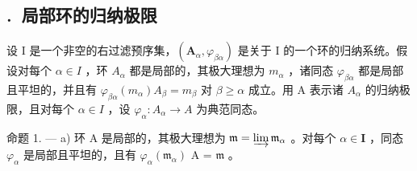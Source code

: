 \subsection*{\theappendixitem.\ 局部环的归纳极限}
{}

设 I 是一个非空的右过滤预序集，\((\mathbf{A}_{\alpha}, \varphi_{\beta\alpha})\) 是关于 I 的一个环的归纳系统。假设对每个 \(\alpha \in I\) ，环 \(A_{\alpha}\) 都是局部的，其极大理想为 \(m_{\alpha}\) ，诸同态 \(\varphi_{\beta\alpha}\) 都是局部且平坦的，并且有 \(\varphi_{\beta\alpha}(m_{\alpha}) A_{\beta} = m_{\beta}\) 对 \(\beta \geqslant \alpha\) 成立。用 A 表示诸 \(A_{\alpha}\) 的归纳极限，且对每个 \(\alpha \in I\) ，设 \(\varphi_{\alpha}: A_{\alpha} \to A\) 为典范同态。

命题 1. --- a) 环 A 是局部的，其极大理想为 \(\mathfrak{m} = \varinjlim \mathfrak{m}_{\alpha}\) 。对每个 \(\alpha \in \mathbf{I}\) ，同态 \(\varphi_{\alpha}\) 是局部且平坦的，且有 \(\varphi_{\alpha}(\mathfrak{m}_{\alpha})\) A = \(\mathfrak{m}\) 。


